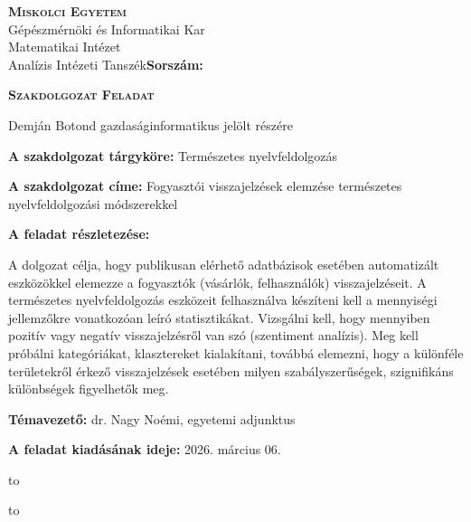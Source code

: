 \begin{flushleft}
\textsc{\bfseries Miskolci Egyetem}\\
Gépészmérnöki és Informatikai Kar\\
Matematikai Intézet\\ Analízis Intézeti Tanszék\hspace*{4cm}\hfil \textbf{Sorszám:}
\end{flushleft}
\vskip 0.5cm
\begin{center}
\large\textsc{\bfseries Szakdolgozat Feladat}
\end{center}
\vskip 0.5cm
Demján Botond gazdaságinformatikus jelölt részére\newline

\noindent\textbf{A szakdolgozat tárgyköre:} Természetes nyelvfeldolgozás\newline

\noindent\textbf{A szakdolgozat címe:} Fogyasztói visszajelzések elemzése természetes nyelvfeldolgozási módszerekkel\newline

\noindent\textbf{A feladat részletezése:}

\medskip
A dolgozat célja, hogy publikusan elérhető adatbázisok esetében automatizált eszközökkel elemezze a fogyasztók (vásárlók, felhasználók) visszajelzéseit. A természetes nyelvfeldolgozás eszközeit felhasználva készíteni kell a mennyiségi jellemzőkre vonatkozóan leíró statisztikákat. Vizsgálni kell, hogy mennyiben pozitív vagy negatív visszajelzésről van szó (szentiment analízis). Meg kell próbálni kategóriákat, klasztereket kialakítani, továbbá elemezni, hogy a különféle területekről érkező visszajelzések esetében milyen szabályszerűségek, szignifikáns különbségek figyelhetők meg.

\medskip

\noindent\textbf{Témavezető:} dr. Nagy Noémi, egyetemi adjunktus\newline

\noindent\textbf{A feladat kiadásának ideje:} 2026. március 06.\newline


\vskip 2cm

\hbox to 

\hbox to 

\newpage

